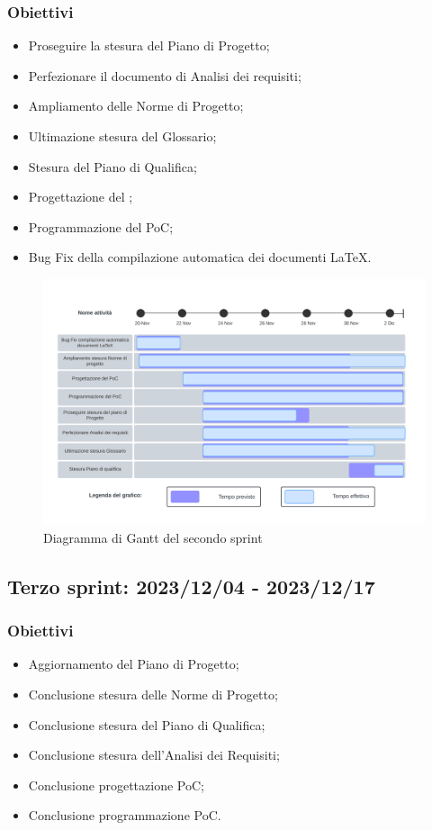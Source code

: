 \subsubsection{Obiettivi}
\begin{itemize}
    \item Proseguire la stesura del Piano di Progetto;
    \item Perfezionare il documento di Analisi dei requisiti;
    \item Ampliamento delle Norme di Progetto;
    \item Ultimazione stesura del Glossario;
    \item Stesura del Piano di Qualifica;
    \item Progettazione del ;
    \item Programmazione del PoC;
    \item Bug Fix della compilazione automatica dei documenti \LaTeX.
\end{itemize}

\begin{figure}[h!]
    \centering  
    \includegraphics[width=\textwidth]{Roadmap2sprint.png}
    \caption{Diagramma di Gantt del secondo sprint}
    \label{fig:roadmap2s}
\end{figure}
\newpage

\subsection{Terzo sprint: 2023/12/04 - 2023/12/17}
\subsubsection{Obiettivi}
\begin{itemize}
    \item Aggiornamento del Piano di Progetto;
    \item Conclusione stesura delle Norme di Progetto;
    \item Conclusione stesura del Piano di Qualifica;
    \item Conclusione stesura dell'Analisi dei Requisiti;
    \item Conclusione progettazione PoC;
    \item Conclusione programmazione PoC.
\end{itemize}


